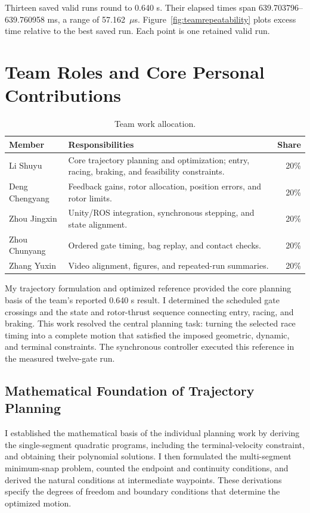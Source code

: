 \documentclass[letterpaper,10pt,conference]{ieeeconf}
\begin{document}
Thirteen saved valid runs round to 0.640 s.
Their elapsed times span 639.703796--639.760958 ms, a range of 57.162~$\mu$s.
Figure~\ref{fig:teamrepeatability} plots excess time relative to the best saved run.
Each point is one retained valid run.

\section{Team Roles and Core Personal Contributions}
\begin{table}[!ht]\centering\small
\caption{Team work allocation.}
\label{tab:teamallocation}
\renewcommand{\arraystretch}{1.12}
\setlength{\tabcolsep}{4pt}
\begin{tabularx}{\columnwidth}{@{}lYr@{}}\toprule
Member&Responsibilities&Share\\\midrule
Li Shuyu&Core trajectory planning and optimization; entry, racing, braking, and feasibility constraints.&20\%\\
Deng Chengyang&Feedback gains, rotor allocation, position errors, and rotor limits.&20\%\\
Zhou Jingxin&Unity/ROS integration, synchronous stepping, and state alignment.&20\%\\
Zhou Chunyang&Ordered gate timing, bag replay, and contact checks.&20\%\\
Zhang Yuxin&Video alignment, figures, and repeated-run summaries.&20\%\\\bottomrule
\end{tabularx}
\end{table}

My trajectory formulation and optimized reference provided the core planning basis of the team's reported 0.640 s result.
I determined the scheduled gate crossings and the state and rotor-thrust sequence connecting entry, racing, and braking.
This work resolved the central planning task: turning the selected race timing into a complete motion that satisfied the imposed geometric, dynamic, and terminal constraints.
The synchronous controller executed this reference in the measured twelve-gate run.

\subsection{Mathematical Foundation of Trajectory Planning}
I established the mathematical basis of the individual planning work by deriving the single-segment quadratic programs, including the terminal-velocity constraint, and obtaining their polynomial solutions.
I then formulated the multi-segment minimum-snap problem, counted the endpoint and continuity conditions, and derived the natural conditions at intermediate waypoints.
These derivations specify the degrees of freedom and boundary conditions that determine the optimized motion.
\end{document}
